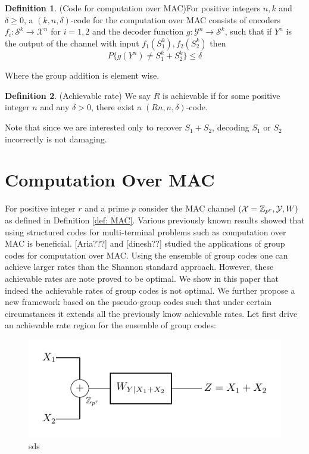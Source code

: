 \documentclass[conference]{IEEEtran}
\theoremstyle{plain}
\theoremstyle{definition}
\newtheorem{definition}{Definition}
\theoremstyle{remark}
\begin{document}
\begin{definition}(Code for computation over MAC)\label{def: code for comp over mac}
For positive integers $n,k$ and $\delta \geq 0$, a $(k,n,\delta)$-code for the computation over MAC consists of encoders $f_i:\mathcal{S}^k \rightarrow \mathcal{X}^n$ for $i=1,2$ and the decoder function $g:\mathcal{Y}^n \rightarrow \mathcal{S}^k$, such that if $Y^n$ is the output of the channel with input $f_1(S_1^k), f_2(S_2^k)$ then 
\begin{equation*}
P\{ g(Y^n)\neq S^k_1+S^k_2\}\leq \delta
\end{equation*} 

Where the group addition is element wise.
\end{definition}



\begin{definition}(Achievable rate)
We say $R$ is achievable if for some positive integer $n$ and any $\delta>0$, there exist a $(Rn,n,\delta)$-code.  
\end{definition}

Note that since we are interested only to recover $S_1+S_2$, decoding $S_1$ or $S_2$ incorrectly is not damaging. 
 
\section{Computation Over MAC}
For positive integer $r$ and a prime $p$ consider the MAC channel $(\mathcal{X}=\mathbb{Z}_{p^r},\mathcal{Y},W)$ as defined in Definition \ref{def: MAC}. Various previously known results showed that using structured codes for multi-terminal problems such as computation over MAC is beneficial. [Aria???] and [dinesh??] studied the applications of group codes for computation over MAC. Using the ensemble of group codes one can achieve larger rates than the Shannon standard approach. However, these achievable rates are note proved to be optimal. We show in this paper that indeed the achievable rates of group codes is not optimal. We further propose a new framework based on the pseudo-group codes such that under certain circumstances it extends all the previously know achievable rates. Let first drive an achievable rate region for the ensemble of group codes:

\begin{figure}
\centering
\includegraphics[scale=1]{Comp_Over_MAC.pdf} 
\caption{sds}
\end{figure}
\end{document}
